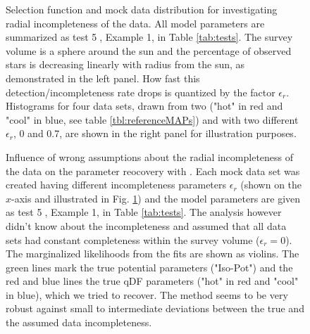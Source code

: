 
\begin{figure}
\caption{Selection function and mock data distribution for investigating radial incompleteness of the data. All model parameters are summarized as test \textcircled{5}, Example 1, in Table \ref{tab:tests}. The survey volume is a sphere around the sun and the percentage of observed stars is decreasing linearly with radius from the sun, as demonstrated in the left panel. How fast this detection/incompleteness rate drops is quantized by the factor $\epsilon_r$. Histograms for four data sets, drawn from two \MAPs ("hot" in red and "cool" in blue, see table \ref{tbl:referenceMAPs}) and with two different $\epsilon_r$, 0 and 0.7, are shown in the right panel for illustration purposes.} 
\label{fig:incompR_mockdata}
\end{figure}


\begin{figure}
\caption{Influence of wrong assumptions about the radial incompleteness of the data on the parameter reocovery with \RM. Each mock data set was created having different incompleteness parameters $\epsilon_r$ (shown on the $x$-axis and illustrated in Fig. \ref{fig:incompR_mockdata}) and the model parameters are given as test \textcircled{5}, Example 1, in Table \ref{tab:tests}. The analysis however didn't know about the incompleteness and assumed that all data sets had constant completeness within the survey volume ($\epsilon_r = 0$). The marginalized likelihoods from the fits are shown as violins. The green lines mark the true potential parameters ("Iso-Pot") and the red and blue lines the true qDF parameters ("hot" \MAP in red and "cool" \MAP in blue), which we tried to recover. The \RM method seems to be very robust against small to intermediate deviations between the true and the assumed data incompleteness.} 
\label{fig:isoSphFlexIncompR_violins}
\end{figure}

